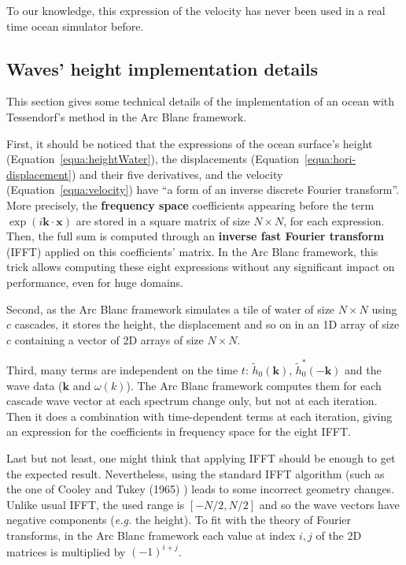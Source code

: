 \documentclass[final]{jcgt}
\def\Framework{The Arc Blanc framework\xspace}
\def\framework{the Arc Blanc framework\xspace}
\begin{document}
To our knowledge, this expression of the velocity has never been used in a real time ocean simulator before.

\subsection{Waves' height implementation details}
This section gives some technical details of the implementation of an ocean with Tessendorf's method in \framework.

First, it should be noticed that the expressions of the ocean surface's height (Equation~\ref{equa:heightWater}), the displacements (Equation~\ref{equa:hori-displacement}) and their five derivatives, and the velocity (Equation~\ref{equa:velocity}) have “a form of an inverse discrete Fourier transform”.
More precisely, the \textbf{frequency space} coefficients appearing before the term $\exp(i\mathbf{k}\cdot\mathbf x)$ are stored in a square matrix of size $N\times N$, for each expression.
Then, the full sum is computed through an \textbf{inverse fast Fourier transform} (IFFT) applied on this coefficients' matrix.
In \framework, this trick allows computing these eight expressions without any significant impact on performance, even for huge domains.

Second, as \framework simulates a tile of water of size $N\times N$ using $c$ cascades, it stores the height, the displacement and so on in an 1D array of size $c$ containing a vector of 2D arrays of size $N\times N$.

Third, many terms are independent on the time $t$: $\tilde{h}_0(\mathbf{k})$, $\tilde{h}_0^*(-\mathbf{k})$ and the wave data ($\mathbf{k}$ and $\omega(k)$).
\Framework computes them for each cascade wave vector at each spectrum change only, but not at each iteration.
Then it does a combination with time-dependent terms at each iteration, giving an expression for the coefficients in frequency space for the eight IFFT.

Last but not least, one might think that applying IFFT should be enough to get the expected result.
Nevertheless, using the standard IFFT algorithm (such as the one of Cooley and Tukey (1965) \cite{cooleyAlgorithmMachineCalculation1965}) leads to some incorrect geometry changes.
Unlike usual IFFT, the used range is $\left[-N/2, N/2\right]$ and so the wave vectors have negative components (\emph{e.g.} the height).
To fit with the theory of Fourier transforms, in \framework each value at index $i,j$ of the 2D matrices is multiplied by $(-1)^{i+j}$.
\end{document}
